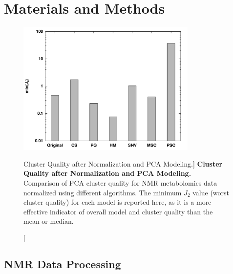 \section{Materials and Methods}

\begin{figure}
\includegraphics[width=3.5in]{figs/pscorr/01-minj2.png}
\caption
      [Cluster Quality after Normalization and PCA Modeling.]{
  {\bf Cluster Quality after Normalization and PCA Modeling.}
  \\
  Comparison of PCA cluster quality for \hnmr{} NMR metabolomics data
  normalized using different algorithms. The minimum $J_2$ value (worst
  cluster quality) for each model is reported here, as it is a more effective
  indicator of overall model and cluster quality than the mean or median.
}
\label{figure.6.1}
\end{figure}

\subsection{NMR Data Processing}

